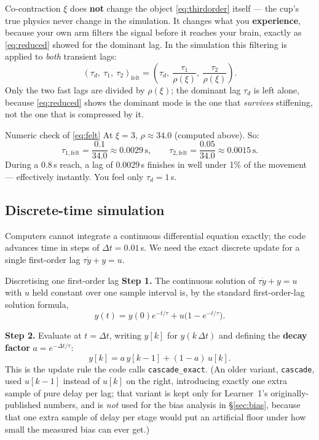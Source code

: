 \documentclass[11pt,a4paper]{article}
\newcommand{\dt}{\Delta t}
\begin{document}
Co-contraction $\xi$ does \textbf{not} change the object \eqref{eq:thirdorder}
itself --- the cup's true physics never change in the simulation. It changes
what you \textbf{experience}, because your own arm filters the signal before
it reaches your brain, exactly as \eqref{eq:reduced} showed for the dominant
lag. In the simulation this filtering is applied to \emph{both} transient
lags:
\begin{equation}
(\tau_d,\ \tau_1,\ \tau_2)_{\text{felt}}
= \left(\tau_d,\ \frac{\tau_1}{\rho(\xi)},\ \frac{\tau_2}{\rho(\xi)}\right).
\label{eq:felt}
\end{equation}
Only the two fast lags are divided by $\rho(\xi)$; the dominant lag $\tau_d$
is left alone, because \eqref{eq:reduced} shows the dominant mode is the one
that \emph{survives} stiffening, not the one that is compressed by it.

\begin{examplebox}{Numeric check of \eqref{eq:felt}}
At $\xi=3$, $\rho\approx34.0$ (computed above). So:
\[
\tau_{1,\text{felt}} = \frac{0.1}{34.0} \approx 0.0029\,\text{s},\qquad
\tau_{2,\text{felt}} = \frac{0.05}{34.0} \approx 0.0015\,\text{s}.
\]
During a 0.8\,s reach, a lag of 0.0029\,s finishes in well under 1\% of the
movement --- effectively instantly. You feel only $\tau_d=1$\,s.
\end{examplebox}

\subsection{Discrete-time simulation}

Computers cannot integrate a continuous differential equation exactly; the
code advances time in steps of $\dt=0.01$\,s. We need the exact discrete
update for a single first-order lag $\tau\dot y + y = u$.

\begin{stepbox}{Discretising one first-order lag}
\textbf{Step 1.} The continuous solution of $\tau\dot y+y=u$ with $u$ held
constant over one sample interval is, by the standard first-order-lag
solution formula,
\[
y(t) = y(0)e^{-t/\tau} + u\bigl(1-e^{-t/\tau}\bigr).
\]

\textbf{Step 2.} Evaluate at $t=\dt$, writing $y[k]$ for $y(k\,\dt)$ and
defining the \textbf{decay factor} $a=e^{-\dt/\tau}$:
\[
y[k] = a\,y[k-1] + (1-a)\,u[k].
\]
This is the update rule the code calls \texttt{cascade\_exact}. (An older
variant, \texttt{cascade}, used $u[k-1]$ instead of $u[k]$ on the right,
introducing exactly one extra sample of pure delay per lag; that variant is
kept only for Learner~1's originally-published numbers, and is \emph{not}
used for the bias analysis in \S\ref{sec:bias}, because that one extra sample
of delay per stage would put an artificial floor under how small the measured
bias can ever get.)
\end{stepbox}
\end{document}
